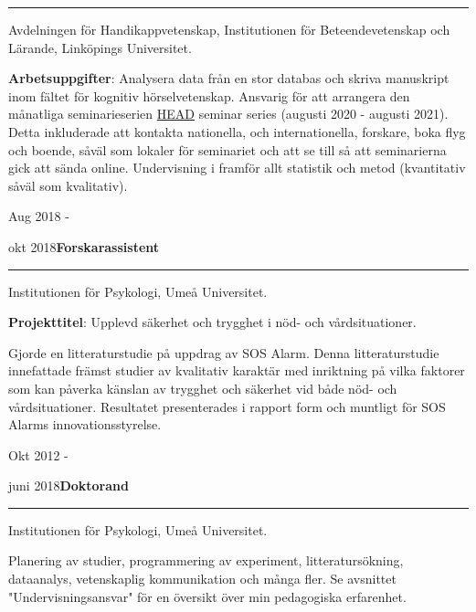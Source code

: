 \documentclass[]{article}
\begin{document}
\hrule
\begin{changemargin}{2.3cm}{2.4cm}

Avdelningen för Handikappvetenskap, Institutionen för Beteendevetenskap och Lärande, Linköpings Universitet.

\textbf{Arbetsuppgifter}: Analysera data från en stor databas och skriva manuskript inom fältet för kognitiv hörselvetenskap. Ansvarig för att arrangera den månatliga seminarieserien \href{https://liu.se/linnecentrum-head/en}{HEAD} seminar series (augusti 2020 - augusti 2021). Detta inkluderade att kontakta nationella, och internationella, forskare, boka flyg och boende, såväl som lokaler för seminariet och att se till så att seminarierna gick att sända online. Undervisning i framför allt statistik och metod (kvantitativ såväl som kvalitativ).

\end{changemargin}

Aug 2018 -

okt 2018\hspace{0.75cm}\textbf{Forskarassistent}\vspace{1mm}

\hrule
\begin{changemargin}{2.3cm}{2.4cm}

Institutionen för Psykologi, Umeå Universitet.

\textbf{Projekttitel}: Upplevd säkerhet och trygghet i nöd- och vårdsituationer.

Gjorde en litteraturstudie på uppdrag av SOS Alarm. Denna litteraturstudie innefattade främst studier av kvalitativ karaktär med inriktning på vilka faktorer som kan påverka känslan av trygghet och säkerhet vid både nöd- och vårdsituationer. Resultatet presenterades i rapport form och muntligt för SOS Alarms innovationsstyrelse.

\end{changemargin}

Okt 2012 -

juni 2018\hspace{0.75cm}\textbf{Doktorand}\vspace{1mm}

\hrule
\begin{changemargin}{2.3cm}{2.4cm}

Institutionen för Psykologi, Umeå Universitet.

Planering av studier, programmering av experiment, litteratursökning, dataanalys, vetenskaplig kommunikation och många fler. Se avsnittet "Undervisningsansvar" för en översikt över min pedagogiska erfarenhet.

\end{changemargin}
\end{document}
